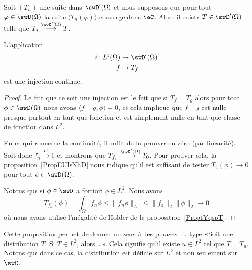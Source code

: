 \begin{theorem}
	Soit \( (T_n)\) une suite dans \( \swD'(\Omega)\) et nous supposons que pour tout \( \varphi\in\swD(\Omega)\) la suite \( \big( T_n(\varphi) \big)\) converge dans \( \eC\). Alors il existe \( T\in\swD'(\Omega)\) telle que \( T_n\stackrel{\swD'(\Omega)}{\longrightarrow}T\).
\end{theorem}

\begin{proposition}\label{PROPooYAJSooMSwVOm}
	L'application
	\begin{equation}
		\begin{aligned}
			i\colon L^2(\Omega) & \to \swD'(\Omega) \\
			f                   & \mapsto T_f
		\end{aligned}
	\end{equation}
	est une injection continue.
\end{proposition}

\begin{proof}
	Le fait que ce soit une injection est le fait que si \( T_f=T_g\) alors pour tout \( \phi\in \swD(\Omega)\) nous avons \( \langle f-g, \phi\rangle =0\), et cela implique que \( f-g\) est nulle presque partout en tant que fonction et est simplement nulle en tant que classe de fonction dans \( L^2\).

	En ce qui concerne la continuité, il suffit de la prouver en zéro (par linéarité). Soit donc \( f_n\stackrel{L^2}{\longrightarrow}0\) et montrons que \( T_{f_n}\stackrel{\swD'(\Omega)}{\longrightarrow} T_0\). Pour prouver cela, la proposition~\ref{PropEUIsNhD} nous indique qu'il est suffisant de tester \( T_n(\phi)\to 0\) pour tout \( \phi\in\swD(\Omega)\).

	Notons que si \( \phi\in \swD\) a fortiori \( \phi\in L^2\). Nous avons
	\begin{equation}
		T_{f_n}(\phi)=\int_{\Omega}f_n\phi\leq \| f_n\phi \|_{L^1}\leq \| f_n \|_2\| \phi \|_2\to 0
	\end{equation}
	où nous avons utilisé l'inégalité de Hölder de la proposition~\ref{ProptYqspT}.
\end{proof}

Cette proposition permet de donner un sens à des phrases du type «Soit une distribution \( T\). Si \( T\in L^2\), alors \ldots». Cela signifie qu'il existe \( u\in L^2\) tel que \( T=T_u\). Notons que dans ce cas, la distribution est définie sur \( L^2\) et non seulement sur \( \swD\).

